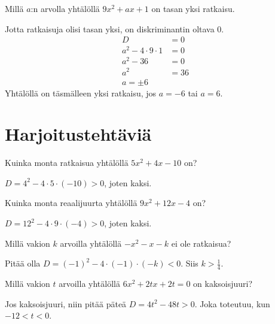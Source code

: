 \begin{esimerkki}
Millä $a$:n arvolla yhtälöllä $9x^2+ax+1$ on tasan yksi ratkaisu.

Jotta ratkaisuja olisi tasan yksi, on diskriminantin oltava 0.
\begin{align*}
D &=0\\
a^2-4\cdot 9\cdot 1 &= 0\\
a^2-36&=0\\
a^2&=36\\
a=\pm6
\end{align*}
Yhtälöllä on täsmälleen yksi ratkaisu, jos $a=-6$ tai $a=6$.
\end{esimerkki}



\section{Harjoitustehtäviä}

\begin{tehtava}
	Kuinka monta ratkaisua yhtälöllä $5x^2+4x-10$ on?
	\begin{vastaus}
		$D=4^2-4\cdot 5 \cdot (-10)>0$, joten kaksi.
	\end{vastaus}
\end{tehtava}
\begin{tehtava}
	Kuinka monta reaalijuurta yhtälöllä $9x^2+12x-4$ on?
	\begin{vastaus}
		$D=12^2-4 \cdot 9 \cdot (-4) >0$, joten kaksi.
	\end{vastaus}
\end{tehtava}
\begin{tehtava}
	Millä vakion $k$ arvoilla yhtälöllä $-x^2-x-k$ ei ole ratkaisua?
	\begin{vastaus}
		Pitää olla $D=(-1)^2-4 \cdot (-1) \cdot (-k)<0$. Siis $k>\frac{1}{4}$.
	\end{vastaus}
\begin{tehtava}
	Millä vakion $t$ arvoilla yhtälöllä $6x^2+2tx+2t=0$ on kaksoisjuuri?
	\begin{vastaus}
		Jos kaksoisjuuri, niin pitää päteä $D=4t^2-48t>0$. Joka toteutuu, kun $-12 < t < 0$. 
	\end{vastaus}
\end{tehtava}
\end{tehtava}
